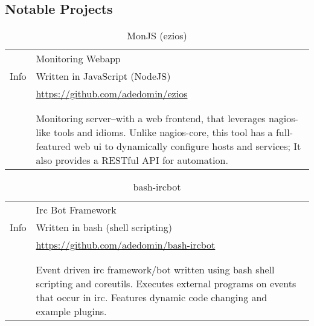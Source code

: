 \documentclass[letterpaper,]{article}
\begin{document}
\subsection{Notable Projects}\label{projects}

\begin{table}[!ht]
\centering
    \caption{MonJS (ezios)}
    \begin{tabularx}{\textwidth}{r|X}
        \multirow{3}{*}{Info} & Monitoring Webapp \\
                              & Written in JavaScript (NodeJS) \\
                              & \href{https://github.com/adedomin/ezios}{https://github.com/adedomin/ezios} \\
        & \\
        \begin{tabular}{@{}l@{}}
            Description \\
        \end{tabular}
        & Monitoring server--with a web frontend, that leverages nagios-like 
        tools and idioms. Unlike nagios-core, this tool has a full-featured 
        web ui to dynamically configure hosts and services; It also provides
        a RESTful API for automation.
    \end{tabularx}
\end{table}

\begin{table}[!ht]
\centering
    \caption{bash-ircbot}
    \begin{tabularx}{\textwidth}{r|X}
        \multirow{3}{*}{Info} & Irc Bot Framework \\
                              & Written in bash (shell scripting) \\
                              & \href{https://github.com/adedomin/bash-ircbot}{https://github.com/adedomin/bash-ircbot} \\
        & \\
        \begin{tabular}{@{}l@{}}
            Description \\
        \end{tabular}
        & Event driven irc framework/bot 
        written using bash shell scripting and coreutils.
        Executes external programs on events that occur in irc.
        Features dynamic code changing and example plugins. 
    \end{tabularx}
\end{table}
\end{document}
